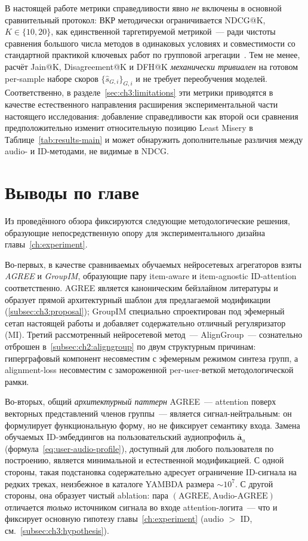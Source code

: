 В настоящей работе метрики справедливости явно \emph{не} включены в основной сравнительный протокол: ВКР методически ограничивается NDCG@K, $K \in \{10, 20\}$, как единственной таргетируемой метрикой~--- ради чистоты сравнения большого числа методов в одинаковых условиях и совместимости со стандартной практикой ключевых работ по групповой агрегации~\cite{cao2018agree, sankar2020groupim, xu2024aligngroup}. Тем не менее, расчёт Jain@K, Disagreement@K и DFH@K \emph{механически тривиален} на готовом per-sample наборе скоров $\{\hat{s}_{G, i}\}_{G, i}$ и не требует переобучения моделей. Соответственно, в разделе~\ref{sec:ch3:limitations} эти метрики приводятся в качестве естественного направления расширения экспериментальной части настоящего исследования: добавление справедливости как второй оси сравнения предположительно изменит относительную позицию Least Misery в Таблице~\ref{tab:results-main} и может обнаружить дополнительные различия между audio- и ID-методами, не видимые в NDCG.

\section{Выводы по главе}
\label{sec:ch2:conclusion}

Из проведённого обзора фиксируются следующие методологические решения, образующие непосредственную опору для экспериментального дизайна главы~\ref{ch:experiment}.

Во-первых, в качестве сравниваемых обучаемых нейросетевых агрегаторов взяты \emph{AGREE} и \emph{GroupIM}, образующие пару item-aware и item-agnostic ID-attention соответственно. AGREE является каноническим бейзлайном литературы и образует прямой архитектурный шаблон для предлагаемой модификации (\ref{subsec:ch3:proposal}); GroupIM специально спроектирован под эфемерный сетап настоящей работы и добавляет содержательно отличный регуляризатор (MI). Третий рассмотренный нейросетевой метод~--- AlignGroup~--- сознательно отброшен в~\ref{subsec:ch2:aligngroup} по двум структурным причинам: гиперграфовый компонент несовместим с эфемерным режимом синтеза групп, а alignment-loss несовместим с замороженной per-user-веткой методологической рамки.

Во-вторых, общий \emph{архитектурный паттерн} AGREE~--- attention поверх векторных представлений членов группы~--- является сигнал-нейтральным: он формулирует функциональную форму, но не фиксирует семантику входа. Замена обучаемых ID-эмбеддингов на пользовательский аудиопрофиль $\bar{\mathbf{a}}_u$ (формула~\eqref{eq:user-audio-profile}), доступный для любого пользователя по построению, является минимальной и естественной модификацией. С одной стороны, такая подстановка содержательно адресует ограничение ID-сигнала на редких треках, неизбежное в каталоге YAMBDA размера $\sim\!10^7$. С другой стороны, она образует чистый ablation: пара $(\text{AGREE}, \text{Audio-AGREE})$ отличается \emph{только} источником сигнала во входе attention-логита~--- что и фиксирует основную гипотезу главы~\ref{ch:experiment} (audio $>$ ID, см.~\ref{subsec:ch3:hypothesis}).

